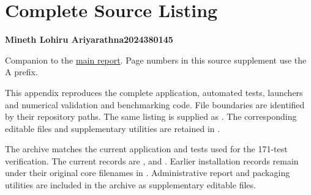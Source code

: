 \section{Complete Source Listing}
\label{sec:a}

\textbf{Mineth Lohiru Ariyarathna}\hfill\textbf{2024380145}

Companion to the \href{report.pdf}{main report}. Page numbers in this source supplement use the A prefix.

This appendix reproduces the complete application, automated tests, launchers and numerical validation and benchmarking code. File boundaries are identified by their repository paths. The same listing is supplied as . The corresponding editable files and supplementary utilities are retained in .

The archive matches the current application and tests used for the 171-test verification. The current records are ,  and . Earlier installation records remain under their original core filenames in . Administrative report and packaging utilities are included in the archive as supplementary editable files.

\begingroup
{}

\endgroup
